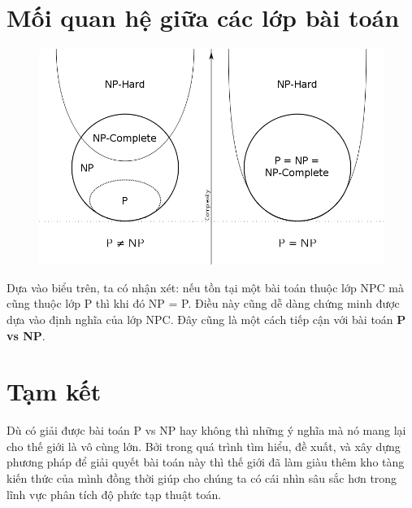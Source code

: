 \documentclass[a4paper 14pt]{article}
\begin{document}
	\section{Mối quan hệ giữa các lớp bài toán}
	\begin{figure}[H]
	\includegraphics[scale = 0.4]{Venn.png}
	\end{figure}
	
	Dựa vào biểu trên, ta có nhận xét: nếu tồn tại một bài toán thuộc lớp NPC mà cũng thuộc lớp P thì khi đó NP = P. Điều này cũng dễ dàng chứng minh được dựa vào định nghĩa của lớp NPC. Đây cũng là một cách tiếp cận với bài toán \textbf{P vs NP}.
	
	\section{Tạm kết}
	Dù có giải được bài toán P vs NP hay không thì những ý nghĩa mà nó mang lại cho thế giới là vô cùng lớn. Bởi trong quá trình tìm hiểu, đề xuất, và xây dựng phương pháp để giải quyết bài toán này thì thế giới đã làm giàu thêm kho tàng kiến thức của mình đồng thời giúp cho chúng ta có cái nhìn sâu sắc hơn trong lĩnh vực phân tích độ phức tạp thuật toán.
\end{document}

